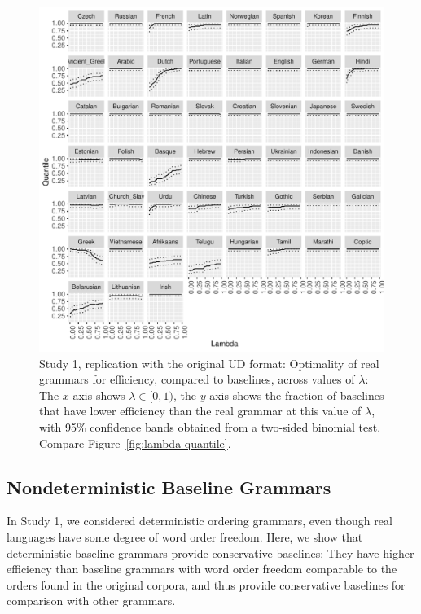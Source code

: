 \documentclass[10pt,twoside,lineno]{article}
\begin{document}
\begin{figure}
	\centering
	\includegraphics[width=\textwidth]{../results/plane/pureUD/analyze_pareto_optimality/figures/quantileByLambda.pdf}
	\caption{Study 1, replication with the original UD format: Optimality of real grammars for efficiency, compared to baselines, across values of $\lambda$: The $x$-axis shows $\lambda \in [0,1)$, the $y$-axis shows the fraction of baselines that have lower efficiency than the real grammar at this value of $\lambda$, with 95\% confidence bands obtained from a two-sided binomial test. Compare Figure~\ref{fig:lambda-quantile}.}\label{fig:lambda-quantile-pureUD}
\end{figure}




\subsection{Nondeterministic Baseline Grammars}

In Study 1, we considered deterministic ordering grammars, even though real languages have some degree of word order freedom.
Here, we show that deterministic baseline grammars provide conservative baselines: They have higher efficiency than baseline grammars with word order freedom comparable to the orders found in the original corpora, and thus provide conservative baselines for comparison with other grammars.
\end{document}
